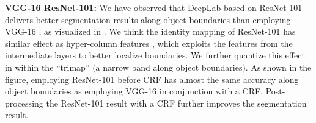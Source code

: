 \textbf{VGG-16 \vs ResNet-101:} We have observed that DeepLab based on ResNet-101 \cite{he2015deep}
delivers better segmentation results along object boundaries than employing VGG-16 \cite{simonyan2014very}, as
visualized in . We think the identity mapping \cite{he2016identity} of ResNet-101
has similar effect as hyper-column features \cite{hariharan2014hypercolumns}, which exploits the features from
the intermediate layers to better localize boundaries. We further quantize this effect in  within the
``trimap'' \cite{kohli2009robust, krahenbuhl2011efficient} (a narrow band along object boundaries). As shown in
the figure, employing ResNet-101 before CRF has almost the same accuracy along object boundaries as employing
VGG-16 in conjunction with a CRF. Post-processing the ResNet-101 result with a CRF further improves the segmentation
result.

